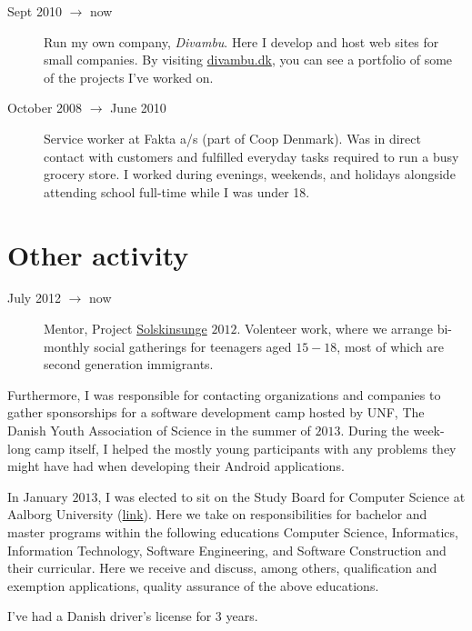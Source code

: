\documentclass[margin,line,a4paper]{resume}
\begin{document}
\begin{resume}
\begin{description}
  \item[Sept 2010 $\rightarrow$ now] Run my own company,
    \emph{Divambu}. Here I develop and host web sites for small companies.
    By visiting \url{divambu.dk}, you can see a portfolio of some of the
    projects I've worked on.

  \item[October 2008 $\rightarrow$ June 2010] Service worker at
    Fakta a/s (part of Coop Denmark). Was in direct contact with customers
    and fulfilled everyday tasks required to run a busy grocery store. I
    worked during evenings, weekends, and holidays alongside attending
    school full-time while I was under 18.
\end{description}

\section{\mysidestyle Other activity}\vspace{1mm}
\begin{description}
  \item[July 2012 $\rightarrow$ now] Mentor, Project
    \href{http://www.urk.dk/solskinsunge/}{Solskinsunge} $2012$. Volenteer
    work, where we arrange bi-monthly social gatherings for teenagers aged
    $15 - 18$, most of which are second generation immigrants.
\end{description}
Furthermore, I was responsible for contacting organizations and
companies to gather sponsorships for a software development camp hosted
by UNF, The Danish Youth Association of Science in the summer of $2013$.
During the week-long camp itself, I helped the mostly young participants
with any problems they might have had when developing their Android
applications.

In January $2013$, I was elected to sit on the Study
Board for Computer Science at Aalborg University
(\href{http://www.en.sict.aau.dk/Study+board+for+Computer+Science/}{link}).
Here we take on responsibilities for bachelor and master programs
within the following educations Computer Science, Informatics,
Information Technology, Software Engineering, and Software Construction
and their curricular. Here we receive and discuss, among others,
qualification and exemption applications, quality assurance of the above
educations.

I've had a Danish driver's license for $3$ years.


\end{resume}
\end{document}
